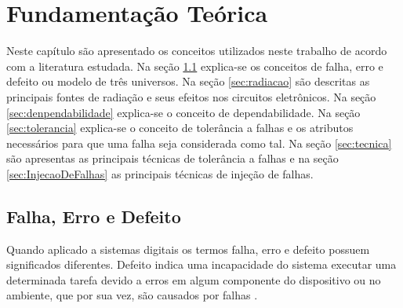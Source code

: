 \chapter{Fundamentação Teórica}\label{cap:funTeorica}

Neste capítulo são apresentado os conceitos utilizados neste trabalho de acordo com a literatura estudada. Na seção \ref{sec:falhaErroDefeito} explica-se os conceitos de falha, erro e defeito ou modelo de três universos. Na seção \ref{sec:radiacao} são descritas as principais fontes de radiação e seus efeitos nos circuitos eletrônicos. Na seção \ref{sec:denpendabilidade} explica-se o conceito de dependabilidade. Na seção \ref{sec:tolerancia} explica-se o conceito de tolerância a falhas e os atributos necessários para que uma falha seja considerada como tal. Na seção \ref{sec:tecnica} são apresentas as principais técnicas de tolerância a falhas e na seção \ref{sec:InjecaoDeFalhas} as principais técnicas de injeção de falhas.

\section{Falha, Erro e Defeito} \label{sec:falhaErroDefeito}

Quando aplicado a sistemas digitais os termos falha, erro e defeito possuem significados diferentes. Defeito indica uma incapacidade do sistema executar uma determinada tarefa devido a erros em algum componente do dispositivo ou no ambiente, que por sua vez, são causados por falhas \cite{Nelson:1990}.

